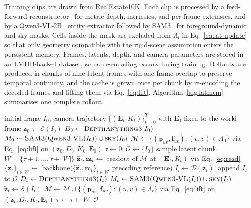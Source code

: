 Training clips are drawn from RealEstate10K.
Each clip is processed by a feed-forward reconstructor~\cite{lin2025depth} for metric depth, intrinsics, and per-frame extrinsics, and by a Qwen3-VL-2B~\cite{yang2025qwen3} entity extractor followed by SAM3~\cite{carion2025sam3segmentconcepts} for foreground-dynamic and sky masks.
Cells inside the mask are excluded from $\Lambda_t$ in Eq.~\ref{eq:lat-update} so that only geometry compatible with the rigid-scene assumption enters the persistent memory.
Frames, latents, depth, and camera parameters are stored in an LMDB-backed dataset, so no re-encoding occurs during training.
Rollouts are produced in chunks of nine latent frames with one-frame overlap to preserve temporal continuity, and the cache is grown once per chunk by re-encoding the decoded frames and lifting them via Eq.~\ref{eq:lift}.
Algorithm~\ref{alg:latmem} summarises one complete rollout.

\begin{algorithm}[t]
\caption{One rollout of \method{}.}
\label{alg:latmem}
\begin{algorithmic}[1]
\Require initial frame $I_0$; camera trajectory $\{(\mathbf{E}_t, K_t)\}_{t=0}^{T}$ with $\mathbf{E}_0$ fixed to the world frame
\State $\mathbf{z}_0 \leftarrow \mathcal{E}(I_0)$
\State $D_0 \leftarrow \textsc{DepthAnything3}(I_0)$
\State $M_0 \leftarrow \textsc{SAM3}(\textsc{Qwen3-VL}(I_0)) \cup \textsc{sky}(I_0)$
\State $\mathcal{M} \leftarrow \{(\mathbf{p}_{uv}, \mathbf{f}_{uv}) : (u, v) \in \Lambda_0\}$ via Eq.~\ref{eq:lift} on $(\mathbf{z}_0, D_0, K_0, \mathbf{E}_0)$
\State $\tau \leftarrow 0$; $\mathcal{O} \leftarrow \{I_0\}$ 
    \State sample latent chunk $W = \{\tau + 1, \dots, \tau + |W|\}$
     
        \State $\hat{\mathbf{z}}_t, \mathbf{m}_t \leftarrow$ readout of $\mathcal{M}$ at $(\mathbf{E}_t, K_t)$ via Eq.~\ref{eq:read}
    \EndFor
    \State $\{\mathbf{z}_t\}_{t \in W} \leftarrow$ backbone$\bigl(\{\hat{\mathbf{z}}_t, \mathbf{m}_t\}_{t \in W}, \text{preceding}, \text{reference}\bigr)$
     
        \State $I_t \leftarrow \mathcal{D}(\mathbf{z}_t)$; append $I_t$ to $\mathcal{O}$
        \State $D_t \leftarrow \textsc{DepthAnything3}(I_t)$
        \State $M_t \leftarrow \textsc{SAM3}(\textsc{Qwen3-VL}(I_t)) \cup \textsc{sky}(I_t)$
        \State $\tilde{\mathbf{z}}_t \leftarrow \mathcal{E}(I_t)$
        \State $\mathcal{M} \leftarrow \mathcal{M} \cup \{(\mathbf{p}_{uv}, \mathbf{f}_{uv}) : (u, v) \in \Lambda_t\}$ via Eq.~\ref{eq:lift} on $(\tilde{\mathbf{z}}_t, D_t, K_t, \mathbf{E}_t)$
    \EndFor
    \State $\tau \leftarrow \tau + |W|$
\EndWhile
\State \Return $\mathcal{O}$
\end{algorithmic}
\end{algorithm}






